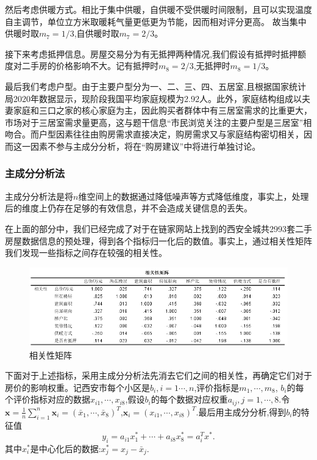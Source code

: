\documentclass[withoutpreface,bwprint]{cumcmthesis} %
\begin{document}
然后考虑供暖方式。相比于集中供暖，自供暖不受供暖时间限制，且可以实现温度自主调节，单位立方米取暖耗气量更低更为节能，因而相对评分更高。
故当集中供暖时取$m_7=1/3$,自供暖时取$m_7=2/3$。

接下来考虑抵押信息。房屋交易分为有无抵押两种情况,我们假设有抵押时抵押额度对二手房的价格影响不大。记有抵押时$m_8=2/3$,无抵押时$m_8=1/3$。

最后我们考虑户型。由于主要户型分为一、二、三、四、五居室,且根据国家统计局2020年数据显示，现阶段我国平均家庭规模为2.92人。此外，家庭结构组成以夫妻家庭和三口之家的核心家庭为主，因此购买者群体中有三居室需求的比重更大，市场对于三居室需求量更高，这与题干信息“市民浏览关注的主要户型是三居室”相吻合。而户型因素往往由购房需求直接决定，购房需求又与家庭结构密切相关，因而这一因素不参与主成分分析，将在“购房建议”中将进行单独讨论。


\subsubsection{主成分分析法}
主成分分析法是将$n$维空间上的数据通过降低噪声等方式降低维度，事实上，处理后的维度上仍存在足够的有效信息，并不会造成关键信息的丢失。

在上面的部分中，我们已经完成了对于在链家网站\cite{RN2}上找到的西安全城共2993套二手房屋数据信息的预处理，得到各个指标归一化后的数值。事实上，通过相关性矩阵我们发现一些指标之间存在较强的相关性。
\begin{figure}[H]
\centering
    \includegraphics[scale=0.8]{相关性矩阵.png}
    \caption{相关性矩阵}
    \label{fig:相关性矩阵}
\end{figure}
下面对于上述指标，采用主成分分析法先消去它们之间的相关性，再确定它们对于房价的影响权重。记西安市每个小区是$b_{i},i=1\cdots,n$,评价指标是$m_1,\cdots,m_8$, $b_i$的每个评价指标对应的数据$x_{i1},\cdots,x_{i8}$,假设$b_i$的每个数据对应权重$a_{ij},j=1,\cdots,8$.令$\bm{x}=\frac{1}{n}\sum_{i=1}^n\bm{x}_i=(\bar{x}_1,\cdots,\bar{x}_8)^T$,$\bm{x}_i=(x_{i1},\cdots,x_{i8})^T$.最后用主成分分析,得到$b_i$的特征值
\begin{equation}
    y_i=a_{i1}x_{1}^\ast+\cdots+a_{i8}x_{8}^\ast=a_i^Tx^\ast.
\end{equation}
其中$x_i^\ast$是中心化后的数据:$x_j^\ast=x_j-\bar{x}_j$.
\end{document}
